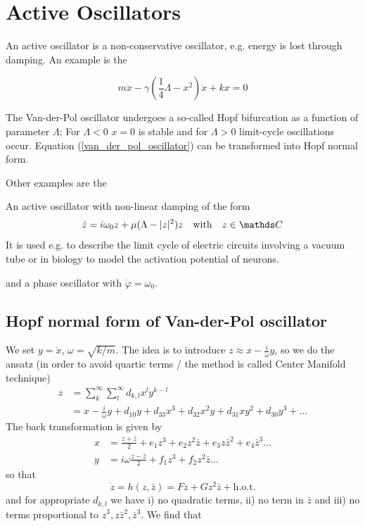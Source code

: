 \documentclass{/home/ben/Templates/notebook}
\begin{document}
	\section{Active Oscillators}
	
	An active oscillator is a non-conservative oscillator, e.g. energy is lost through damping. An example is the 
	\begin{theorem}
		\begin{equation}
		m \ddot{x} - \gamma (\frac{1}{4} \Lambda - x^2) \dot{x} + kx = 0
		\label{van_der_pol_oscillator}
		\end{equation}
	\end{theorem}
	The Van-der-Pol oscillator undergoes a so-called Hopf bifurcation as a function of parameter $\Lambda$: For $\Lambda < 0$ $x = 0$ is stable and for $\Lambda > 0$ limit-cycle oscillations occur. Equation (\ref{van_der_pol_oscillator}) can be transformed into Hopf normal form. 
	
	Other examples are the 
	\begin{theorem}
		An active oscillator with non-linear damping of the form
		\begin{equation}
		\dot{z} = i \omega_0 z + \mu(\Lambda - |z|^2)z \quad \mathrm{with} \quad z \in \C
		\end{equation}
		It is used e.g. to describe the limit cycle of electric circuits involving a vacuum tube or in biology to model the activation potential of neurons.
	\end{theorem}
	and a phase oscillator with $\dot{\varphi} = \omega_0$. 
	
	\subsection*{Hopf normal form of Van-der-Pol oscillator}
	
	We set $y = \dot{x}$, $\omega = \sqrt{k/m}$. The idea is to introduce $z \approx x - \frac{i}{\omega} y$, so we do the ansatz (in order to avoid quartic terms / the method is called Center Manifold technique)
	\begin{align*}
		z &= \sum_{k}^{\infty}\sum_{l}^{\infty}{d_{k,l}x^l y^{k-l}} \\
		&= x - \frac{i}{\omega} y + d_{10}y + d_{33}x^3 + d_32 x^2 y + d_{31} xy^2 + d_{30} y^3 + \dots
	\end{align*}
	The back transformation is given by
	\begin{align*}
		x &= \frac{z + \bar{z}}{2} + e_1 z^3 + e_2 z^2 \bar{z} + e_3 z \bar{z}^2 + e_4 \bar{z}^3 \dots \\
		y &= i \omega \frac{z - \bar{z}}{2} + f_1 z^3 + f_2 z^2 \bar{z} \dots
	\end{align*}
	so that
	\begin{equation}
	\dot{z} = h(z, \bar{z}) = Fz + G z^2 \bar{z} + \mathrm{h.o.t.}
	\end{equation}
	and for appropriate $d_{k,l}$ we have i) no quadratic terms, ii) no term in $\bar{z}$ and iii) no terms proportional to $z^3, z\bar{z}^2, \bar{z}^3$. We find that
	
\end{document}
